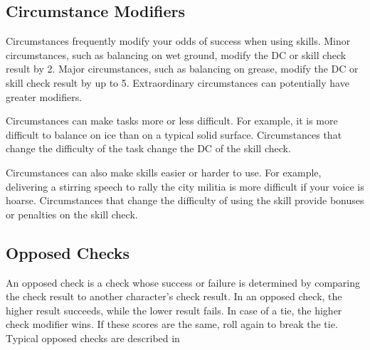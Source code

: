 \subsection{Circumstance Modifiers}

Circumstances frequently modify your odds of success when using skills. Minor circumstances, such as balancing on wet ground, modify the DC or skill check result by 2. Major circumstances, such as balancing on grease, modify the DC or skill check result by up to 5. Extraordinary circumstances can potentially have greater modifiers.

 Circumstances can make tasks more or less difficult. For example, it is more difficult to balance on ice than on a typical solid surface. Circumstances that change the difficulty of the task change the DC of the skill check.

 Circumstances can also make skills easier or harder to use. For example, delivering a stirring speech to rally the city militia is more difficult if your voice is hoarse. Circumstances that change the difficulty of using the skill provide bonuses or penalties on the skill check.

\subsection{Opposed Checks}
An opposed check is a check whose success or failure is determined by comparing the check result to another character's check result. In an opposed check, the higher result succeeds, while the lower result fails. In case of a tie, the higher check modifier wins. If these scores are the same, roll again to break the tie. Typical opposed checks are described in 

